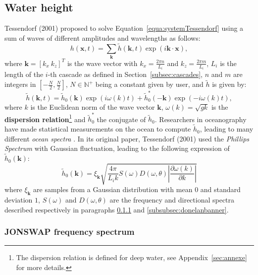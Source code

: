 \documentclass[11pt]{article}
\begin{document}
\subsection{Water height}
\label{subsec:waterHeight}
Tessendorf (2001) \cite{tessendorfSimulatingOceanWater2001} proposed to solve Equation~\ref{equa:systemTessendorf} using a sum of waves of different amplitudes and wavelengths as follows:
\begin{equation}
	\label{equa:heightWater}
	h(\mathbf x,t)=\sum_{\mathbf{k}} \tilde{h}(\mathbf{k}, t) \exp\left( i \mathbf{k}\cdot \mathbf x\right),
\end{equation}
where $\mathbf{k}=\left[k_x\ k_z\right]^T$ is the wave vector with $k_x=\frac{2\pi n}{L_{i}}$ and $k_z=\frac{2\pi m}{L_{i}}$, $L_i$ is the length of the $i$-th cascade as defined in Section~\ref{subsec:cascades}, $n$ and $m$ are integers in $\left[-\frac{N}{2},\frac{N}{2}\right]$, $N\in\mathbb N^+$ being a constant given by user, and $\tilde{h}$ is given by:
\begin{equation}
	\label{equa:heightWaterBis}
	\tilde{h}(\mathbf{k}, t) = \tilde{h}_0(\mathbf{k})\exp(i\omega(k)t)+\tilde{h}_0^*(-\mathbf{k})\exp(-i\omega(k)t),
\end{equation}
where $k$ is the Euclidean norm of the wave vector $\mathbf{k}$, $\omega(k)=\sqrt{gk}$ is the \textbf{dispersion relation}\footnote{The dispersion relation is defined for deep water, see Appendix~\ref{sec:annexe} for more details.} and $\tilde{h}_0^*$ the conjugate of $\tilde{h}_0$.
Researchers in oceanography have made statistical measurements on the ocean to compute $\tilde{h}_0$, leading to many different \textit{ocean spectra} \cite{tessendorfGilliganPrototypeFramework2017}.
In its original paper, Tessendorf (2001) \cite{tessendorfSimulatingOceanWater2001} used the \textit{Phillips Spectrum} with Gaussian fluctuation, leading to the following expression of $\tilde{h}_0(\mathbf{k})$:
\begin{equation}
	\tilde{h}_0(\mathbf{k}) = \xi_{\mathbf{k}}\sqrt{\frac{4\pi}{L_ik}S(\omega)D(\omega, \theta)\left|\frac{\partial\omega(k)}{\partial k}\right|}
\end{equation}
where $\xi_{\mathbf{k}}$ are samples from a Gaussian distribution with mean $0$ and standard deviation $1$, $S(\omega)$ and $D(\omega, \theta)$ are the frequency and directional spectra described respectively in paragraphs \ref{subsubsec:jonswap} and \ref{subsubsec:donelanbanner}.

\subsubsection{JONSWAP frequency spectrum}
\label{subsubsec:jonswap}
\end{document}
